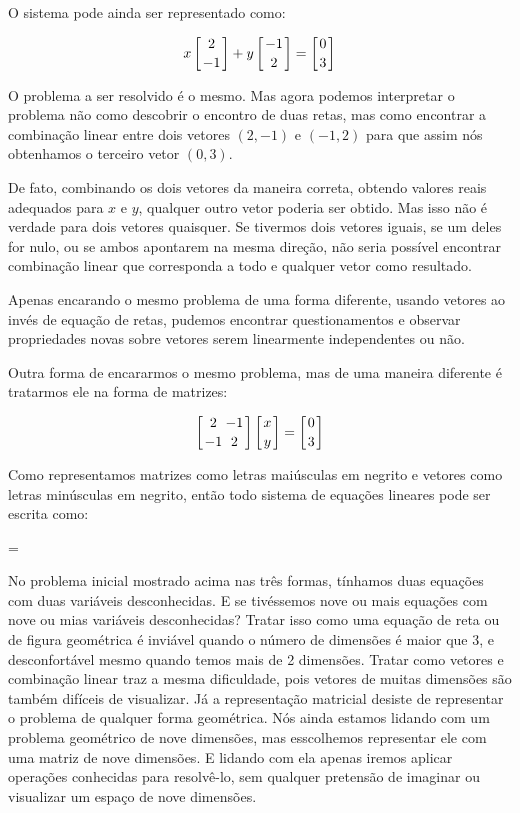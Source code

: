 O sistema pode ainda ser representado como:

$$x\left[{2\atop-1}\right]+y\left[-1\atop 2\right]=\left[0\atop3\right]$$

O problema a ser resolvido é o mesmo. Mas agora podemos interpretar o
problema não como descobrir o encontro de duas retas, mas como
encontrar a combinação linear entre dois vetores $(2, -1)$ e $(-1, 2)$
para que assim nós obtenhamos o terceiro vetor $(0, 3)$.

De fato, combinando os dois vetores da maneira correta, obtendo
valores reais adequados para $x$ e $y$, qualquer outro vetor poderia
ser obtido. Mas isso não é verdade para dois vetores quaisquer. Se
tivermos dois vetores iguais, se um deles for nulo, ou se ambos
apontarem na mesma direção, não seria possível encontrar combinação
linear que corresponda a todo e qualquer vetor como resultado.

Apenas encarando o mesmo problema de uma forma diferente, usando
vetores ao invés de equação de retas, pudemos encontrar
questionamentos e observar propriedades novas sobre vetores serem
linearmente independentes ou não.

Outra forma de encararmos o mesmo problema, mas de uma maneira
diferente é tratarmos ele na forma de matrizes:

$$
\left[{2 \atop -1}{-1\atop 2}\right]\left[{x\atop y}\right]=\left[{0\atop 3}\right]
$$

Como representamos matrizes como letras mai\-ús\-cu\-las em negrito e
vetores como letras mi\-nús\-cu\-las em negrito, então todo sistema de
equações lineares pode ser escrita como:

=

No problema inicial mostrado acima nas três formas, tínhamos duas
equações com duas variáveis desconhecidas. E se tivéssemos nove ou
mais equações com nove ou mias variáveis desconhecidas? Tratar isso
como uma equação de reta ou de figura geométrica é inviável quando o
número de dimensões é maior que 3, e desconfortável mesmo quando temos
mais de 2 dimensões. Tratar como vetores e combinação linear traz a
mesma dificuldade, pois vetores de muitas dimensões são também
difíceis de visualizar. Já a representação matricial desiste de
representar o problema de qualquer forma geométrica. Nós ainda estamos
lidando com um problema geométrico de nove dimensões, mas esscolhemos
representar ele com uma matriz de nove dimensões. E lidando com ela
apenas iremos aplicar operações conhecidas para resolvê-lo, sem
qualquer pretensão de imaginar ou visualizar um espaço de nove
dimensões.

